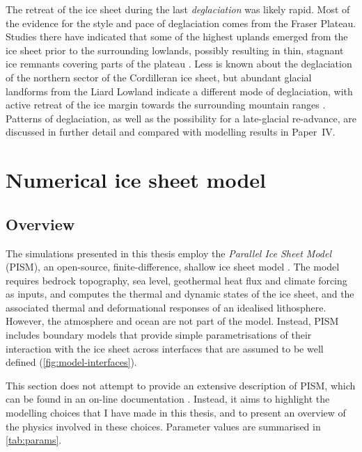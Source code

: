 \documentclass[a4paper]{kappa}
\newcommand{\CCYC}[0]{Paper~IV}     %
\begin{document}
The retreat of the ice sheet during the last \emph{deglaciation} was likely
rapid. Most of the evidence for the style and pace of deglaciation comes from
the Fraser Plateau. Studies there have indicated that some of the highest
uplands emerged from the ice sheet prior to the surrounding lowlands, possibly
resulting in thin, stagnant ice remnants covering parts of the plateau
\citep{Fulton.1967, Fulton.1991, Margold.etal.2011, Margold.etal.2013a}. Less
is known about the deglaciation of the northern sector of the Cordilleran ice
sheet, but abundant glacial landforms from the Liard Lowland indicate a
different mode of deglaciation, with active retreat of the ice margin towards
the surrounding mountain ranges \citep{Margold.etal.2013}. Patterns of
deglaciation, as well as the possibility for a late-glacial re-advance, are
discussed in further detail and compared with modelling results in
\CCYC.

\section{Numerical ice sheet model}

\subsection{Overview}

The simulations presented in this thesis employ the \emph{Parallel Ice Sheet
Model} (PISM), an open-source, finite-difference, shallow ice sheet model
\citep{PISM-authors.2014}. The model requires bedrock topography, sea level,
geothermal heat flux and climate forcing as inputs, and computes the thermal
and dynamic states of the ice sheet, and the associated thermal and
deformational responses of an idealised lithosphere. However, the atmosphere
and ocean are not part of the model. Instead, PISM includes boundary models
that provide simple parametrisations of their interaction with the ice sheet
across interfaces that are assumed to be well defined
(\cref{fig:model-interfaces}).

This section does not attempt to provide an extensive description of PISM,
which can be found in an on-line documentation
\citep[\url{http://www.pism-docs.org},][]{PISM-authors.2014}.
Instead, it aims to highlight the modelling choices that I have made in this
thesis, and to present an overview of the physics involved in these choices.
Parameter values are summarised in \cref{tab:params}.
\end{document}
